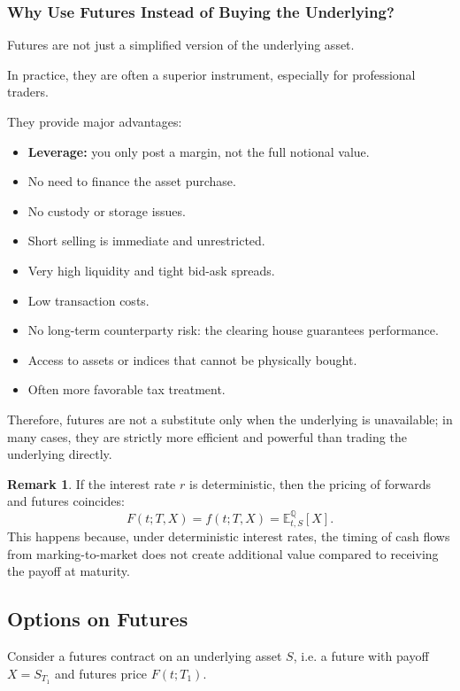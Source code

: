 \documentclass[12pt,a4paper]{article}
\theoremstyle{definition}
\newtheorem{remark}{Remark}[section]
\newcommand{\Q}{\mathbb{Q}}
\newcommand{\E}{\mathbb{E}}
\begin{document}
\subsubsection{Why Use Futures Instead of Buying the Underlying?}

Futures are not just a simplified version of the underlying asset.

In practice, they are often a superior instrument, especially for professional traders.

They provide major advantages:
\begin{itemize}
\item \textbf{Leverage:} you only post a margin, not the full notional value.
\item No need to finance the asset purchase.
\item No custody or storage issues.
\item Short selling is immediate and unrestricted.
\item Very high liquidity and tight bid-ask spreads.
\item Low transaction costs.
\item No long-term counterparty risk: the clearing house guarantees performance.
\item Access to assets or indices that cannot be physically bought.
\item Often more favorable tax treatment.
\end{itemize}

Therefore, futures are not a substitute only when the underlying is unavailable; in many cases, they are strictly more efficient and powerful than trading the underlying directly.

\begin{remark}
If the interest rate $r$ is deterministic, then the pricing of forwards and futures coincides:
\[
F(t; T, X) = f(t; T, X) = \E_{t,S}^\Q[X].
\]
This happens because, under deterministic interest rates, the timing of cash flows from marking-to-market does not create additional value compared to receiving the payoff at maturity.
\end{remark}

\subsection{Options on Futures}

Consider a futures contract on an underlying asset $S$, i.e. a future with payoff $X = S_{T_1}$ and futures price $F(t; T_1)$.
\end{document}

